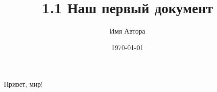 \documentclass[a4paper,12pt]{article}
\author{Имя Автора}
\title{1.1 Наш первый документ}
\date{\today}
\begin{document}

\maketitle

Привет, мир!
\end{document}
